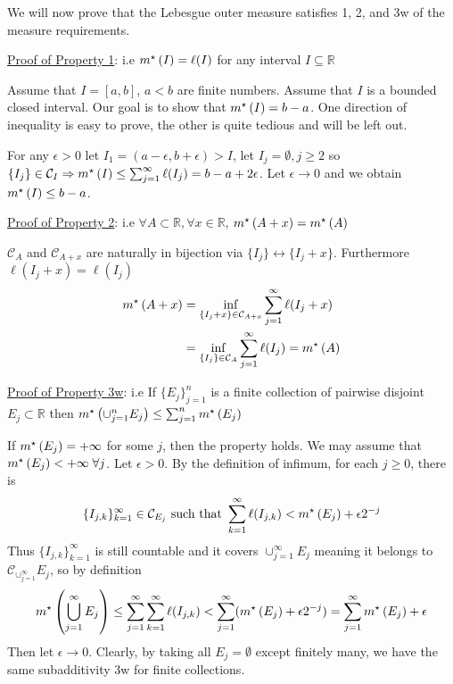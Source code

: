 We will now prove that the Lebesgue outer measure satisfies 1, 2, and 3w of the measure requirements.

\underline{Proof of Property 1}:
i.e $m^{\star}\left(I\right) = \ell(I)$ for any interval $I \subseteq \mathbb{R}$

Assume that $I = [a,b]$, $a < b$ are finite numbers.
Assume that $I$ is a bounded closed interval.
Our goal is to show that $m^{\star}\left(I\right) = b -a$.
One direction of inequality is easy to prove, the other is quite tedious and will be left out.

For any $\epsilon > 0$ let $I_1 = (a-\epsilon, b + \epsilon) > I$, let $I_j = \emptyset, j \geq 2$ so $\{I_j \} \in \mathcal{C}_I \Rightarrow m^{\star}\left(I\right) \leq \sum_{j=1}^{\infty} \ell (I_j) = b - a + 2 \epsilon$.
Let $\epsilon \rightarrow 0$ and we obtain $m^{\star}\left(I\right) \leq b-a$.

\underline{Proof of Property 2}:
i.e $\forall A \subset \mathbb{R}, \forall x \in \mathbb{R}$, $m^{\star}\left(A+x\right) = m^{\star}\left(A\right)$

$\mathcal{C}_A$ and $\mathcal{C}_{A+x}$ are naturally in bijection via $\{ I_j \} \leftrightarrow \{ I_j + x \}$.
Furthermore $\ell (I_j + x) = \ell (I_j)$
\begin{align*}
    m^{\star}\left(A+x\right) &= \inf_{\{I_j +x\} \in \mathcal{C}_{A+x}} \sum_{j=1}^{\infty} \ell (I_j + x) \\
    &= \inf_{\{I_j\} \in \mathcal{C}_{A}} \sum_{j=1}^{\infty} \ell (I_j) = m^{\star}\left(A\right)
\end{align*}

\underline{Proof of Property 3w}:
i.e If $\{ E_j \}_{j=1}^{n}$ is a finite collection of pairwise disjoint $E_j \subset \mathbb{R}$ then $m^{\star}\left(\cup_{j=1}^{n} E_j\right) \leq \sum_{j=1}^{n} m^{\star}\left(E_j\right)$

If $m^{\star}\left(E_j\right) = +\infty$ for some $j$, then the property holds.
We may assume that $m^{\star}\left(E_j\right) < + \infty \; \forall j$.
Let $\epsilon > 0$.
By the definition of infimum, for each $j \geq 0$, there is
\[
    \{ I_{j,k} \}_{k=1}^{\infty} \in \mathcal{C}_{E_j} \text{ such that } \sum_{k=1}^{\infty} \ell (I_{j,k}) < m^{\star}\left(E_j\right) + \epsilon 2^{-j}
\]
Thus $\{ I_{j,k} \}_{k=1}^{\infty}$ is still countable and it covers $\cup_{j=1}^{\infty} E_j$ meaning it belongs to $\mathcal{C}_{\cup_{j=1}^{\infty}} E_j$, so by definition
\[
   m^{\star}\left(\bigcup_{j=1}^{\infty} E_j\right) \leq \sum_{j=1}^{\infty} \sum_{k=1}^{\infty} \ell (I_{j,k}) < \sum_{j=1}^{\infty} (m^{\star}\left(E_j\right) + \epsilon 2^{-j}) = \sum_{j=1}^{\infty} m^{\star}\left(E_j\right) + \epsilon
\]
Then let $\epsilon \rightarrow 0$.
Clearly, by taking all $E_j = \emptyset$ except finitely many, we have the same subadditivity 3w for finite collections.

